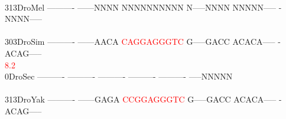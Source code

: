 \documentclass[11pt,twoside,reqno,a4paper]{article}
\begin{document}
{\\
313\hspace*{1\charwidth}DroMel	----------	------NNNN	NNNNNNNNNN	N-----NNNN	NNNNN-----	-NNNN-----	\\
\hspace*{4\charwidth}\hspace*{7\charwidth}\hspace*{1\charwidth}\hspace*{1\charwidth}\hspace*{1\charwidth}\hspace*{1\charwidth}\hspace*{1\charwidth}\hspace*{1\charwidth}\\
303\hspace*{1\charwidth}DroSim	----------	------AACA	\textcolor{red}{C}\textcolor{red}{A}\textcolor{red}{G}\textcolor{red}{G}\textcolor{red}{A}\textcolor{red}{G}\textcolor{red}{G}\textcolor{red}{G}\textcolor{red}{T}\textcolor{red}{C}	G-----GACC	ACACA-----	-ACAG-----	\\
\hspace*{4\charwidth}\hspace*{7\charwidth}\hspace*{1\charwidth}\hspace*{1\charwidth}\hspace*{20\charwidth}\textcolor{red}{8.2}\hspace*{1\charwidth}\hspace*{1\charwidth}\hspace*{1\charwidth}\hspace*{1\charwidth}\\
0\hspace*{3\charwidth}DroSec	----------	----------	----------	----------	----------	-----NNNNN	\\
\hspace*{4\charwidth}\hspace*{7\charwidth}\hspace*{1\charwidth}\hspace*{1\charwidth}\hspace*{1\charwidth}\hspace*{1\charwidth}\hspace*{1\charwidth}\hspace*{1\charwidth}\\
313\hspace*{1\charwidth}DroYak	----------	------GAGA	\textcolor{red}{C}\textcolor{red}{C}\textcolor{red}{G}\textcolor{red}{G}\textcolor{red}{A}\textcolor{red}{G}\textcolor{red}{G}\textcolor{red}{G}\textcolor{red}{T}\textcolor{red}{C}	G-----GACC	ACACA-----	-ACAG-----	\\
}
\end{document}
